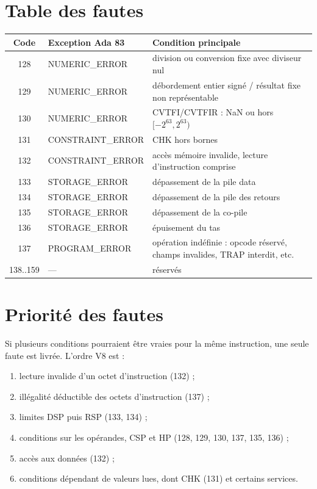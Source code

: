 \documentclass[10pt,a4paper,twoside,openany]{book}
\begin{document}
\section{Table des fautes}
\begin{center}
\begin{tabularx}{\linewidth}{@{}c l X@{}}
\toprule
\textbf{Code} & \textbf{Exception Ada 83} & \textbf{Condition principale}\\ \midrule
128 & NUMERIC\_ERROR & division ou conversion fixe avec diviseur nul\\
129 & NUMERIC\_ERROR & débordement entier signé / résultat fixe non représentable\\
130 & NUMERIC\_ERROR & CVTFI/CVTFIR : NaN ou hors $[-2^{63},2^{63})$\\
131 & CONSTRAINT\_ERROR & CHK hors bornes\\
132 & CONSTRAINT\_ERROR & accès mémoire invalide, lecture d'instruction comprise\\
133 & STORAGE\_ERROR & dépassement de la pile data\\
134 & STORAGE\_ERROR & dépassement de la pile des retours\\
135 & STORAGE\_ERROR & dépassement de la co-pile\\
136 & STORAGE\_ERROR & épuisement du tas\\
137 & PROGRAM\_ERROR & opération indéfinie : opcode réservé, champs invalides, TRAP interdit, etc.\\
138..159 & --- & réservés\\
\bottomrule
\end{tabularx}
\end{center}

\section{Priorité des fautes}
Si plusieurs conditions pourraient être vraies pour la même instruction, une seule faute est livrée. L'ordre V8 est :
\begin{enumerate}
\item lecture invalide d'un octet d'instruction (132) ;
\item illégalité déductible des octets d'instruction (137) ;
\item limites DSP puis RSP (133, 134) ;
\item conditions sur les opérandes, CSP et HP (128, 129, 130, 137, 135, 136) ;
\item accès aux données (132) ;
\item conditions dépendant de valeurs lues, dont CHK (131) et certains services.
\end{enumerate}
\end{document}
